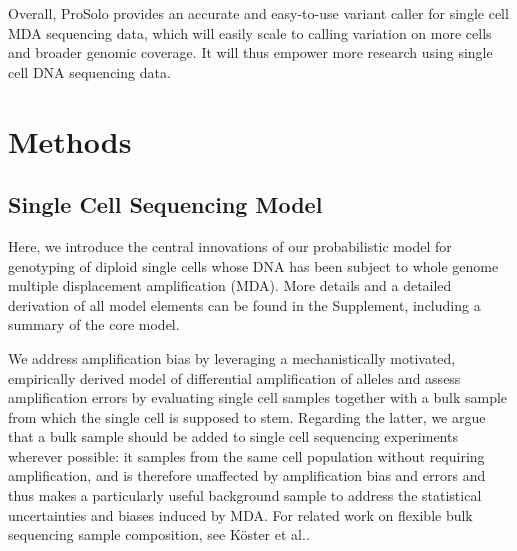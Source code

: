 \documentclass[12pt,inline]{wlscirep}
\begin{document}
Overall, ProSolo provides an accurate and easy-to-use variant caller for single cell MDA sequencing data, which will easily scale to calling variation on more cells and broader genomic coverage.
It will thus empower more research using single cell DNA sequencing data.

\section*{Methods}

\subsection*{Single Cell Sequencing Model}

Here, we introduce the central innovations of our probabilistic model for genotyping of diploid single cells whose DNA has been subject to whole genome multiple displacement amplification (MDA)\cite{dean_comprehensive_2002}.
More details and a detailed derivation of all model elements can be found in the Supplement, including a summary of the core model.

We address amplification bias by leveraging a mechanistically motivated, empirically derived model of differential amplification of alleles and assess amplification errors by evaluating single cell samples together with a bulk sample from which the single cell is supposed to stem.
Regarding the latter, we argue that a bulk sample should be added to single cell sequencing experiments wherever possible: it samples from the same cell population without requiring amplification, and is therefore unaffected by amplification bias and errors and thus makes a particularly useful background sample to address the statistical uncertainties and biases induced by MDA.
For related work on flexible bulk sequencing sample composition, see Köster et al.\cite{koster_varlociraptor_2020}.
\end{document}
